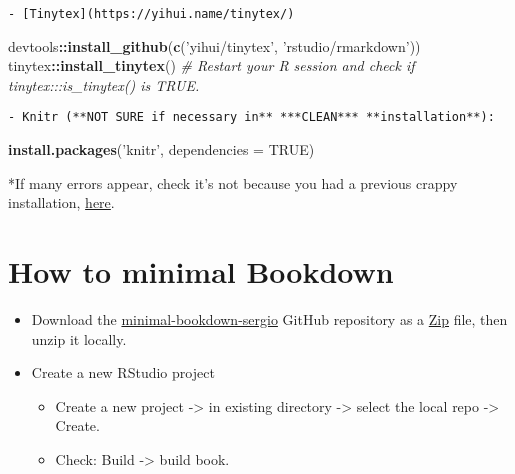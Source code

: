 \documentclass[]{book}
\newenvironment{Shaded}{\begin{snugshade}}{\end{snugshade}}
\newcommand{\KeywordTok}[1]{\textcolor[rgb]{0.13,0.29,0.53}{\textbf{#1}}}
\newcommand{\DataTypeTok}[1]{\textcolor[rgb]{0.13,0.29,0.53}{#1}}
\newcommand{\StringTok}[1]{\textcolor[rgb]{0.31,0.60,0.02}{#1}}
\newcommand{\CommentTok}[1]{\textcolor[rgb]{0.56,0.35,0.01}{\textit{#1}}}
\newcommand{\OtherTok}[1]{\textcolor[rgb]{0.56,0.35,0.01}{#1}}
\newcommand{\OperatorTok}[1]{\textcolor[rgb]{0.81,0.36,0.00}{\textbf{#1}}}
\newcommand{\NormalTok}[1]{#1}
\providecommand{\tightlist}{%
  \setlength{\itemsep}{0pt}\setlength{\parskip}{0pt}}
\theoremstyle{definition}
\theoremstyle{definition}
\theoremstyle{definition}
\theoremstyle{remark}
\begin{document}
\begin{verbatim}
- [Tinytex](https://yihui.name/tinytex/)  
\end{verbatim}

\begin{Shaded}
\begin{Highlighting}[]
\NormalTok{devtools}\OperatorTok{::}\KeywordTok{install_github}\NormalTok{(}\KeywordTok{c}\NormalTok{(}\StringTok{'yihui/tinytex'}\NormalTok{, }\StringTok{'rstudio/rmarkdown'}\NormalTok{))}
\NormalTok{tinytex}\OperatorTok{::}\KeywordTok{install_tinytex}\NormalTok{()}
\CommentTok{# Restart your R session and check if tinytex:::is_tinytex() is TRUE.}
\end{Highlighting}
\end{Shaded}

\begin{verbatim}
- Knitr (**NOT SURE if necessary in** ***CLEAN*** **installation**):  
\end{verbatim}

\begin{Shaded}
\begin{Highlighting}[]
\KeywordTok{install.packages}\NormalTok{(}\StringTok{'knitr'}\NormalTok{, }\DataTypeTok{dependencies =} \OtherTok{TRUE}\NormalTok{)}
\end{Highlighting}
\end{Shaded}

*If many errors appear, check it's not because you had a previous crappy
installation, \protect\hyperlink{ref_CleanPreviousCrap}{here}.

\chapter{How to minimal Bookdown}\label{how-to-minimal-bookdown}

\begin{itemize}
\tightlist
\item
  Download the
  \href{https://github.com/sergiogoro/minimal-bookdown-sergio}{minimal-bookdown-sergio}
  GitHub repository as a
  \href{https://github.com/sergiogoro/minimal-bookdown-sergio/archive/master.zip}{Zip}
  file, then unzip it locally.\\
\item
  Create a new RStudio project

  \begin{itemize}
  \tightlist
  \item
    Create a new project -\textgreater{} in existing directory
    -\textgreater{} select the local repo -\textgreater{} Create.\\
  \item
    Check: Build -\textgreater{} build book.
  \end{itemize}
\end{itemize}
\end{document}

